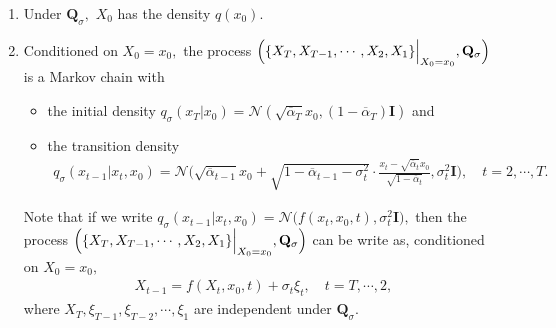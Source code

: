 \documentclass[
]{article}
\providecommand{\tightlist}{%
  \setlength{\itemsep}{0pt}\setlength{\parskip}{0pt}}\usepackage{longtable,booktabs,array}
\theoremstyle{remark}
\begin{document}
\begin{enumerate}
\def\labelenumi{\arabic{enumi}.}
\tightlist
\item
  Under \(\mathbf{Q}_{\sigma},\) \(X_0\) has the density \(q(x_0).\)
\item
  Conditioned on \(X_0=x_0,\) the process
  \(\Bigl( \lbrace X_T,X_{T-1},\cdots, X_2,X_1\rbrace\Big\vert_{X_0=x_0}, \mathbf{Q}_{\sigma} \Bigr)\)
  is a Markov chain with

  \begin{itemize}
  \tightlist
  \item
    the initial density
    \(q_{\sigma}(x_T\vert x_0)= \mathcal{N}(\sqrt{\overline{\alpha}_T}x_0,(1-\overline{\alpha}_T)\mathbf{I})\)
    and
  \item
    the transition density \[
     \begin{aligned}
       q_{\sigma} (x_{t-1}\vert x_t,x_0) = \mathcal{N}\biggl( \sqrt{\overline{\alpha}_{t-1}}x_0 + \sqrt{1-\overline{\alpha}_{t-1} - \sigma_t^2} \cdot \frac{x_t-\sqrt{\overline{\alpha}_t}x_0}{\sqrt{1-\overline{\alpha}_t}} , \sigma_t^2 \mathbf{I} \biggr), \quad t=2,\cdots, T.
     \end{aligned}
     \]
  \end{itemize}

  Note that if we write
  \(q_{\sigma}(x_{t-1}\vert x_t,x_0)=\mathcal{N} \bigl(f(x_t,x_0,t), \sigma_t^2 \mathbf{I}\bigr),\)
  then the process
  \(\Bigl( \lbrace X_T,X_{T-1},\cdots, X_2,X_1\rbrace\Big\vert_{X_0=x_0}, \mathbf{Q}_{\sigma} \Bigr)\)
  can be write as, conditioned on \(X_0=x_0,\) \[
  \begin{aligned}
    X_{t-1} = f(X_t,x_0,t) + \sigma_t \xi_t, \quad t=T,\cdots, 2,
  \end{aligned}
  \] where \(X_T,\xi_{T-1},\xi_{T-2},\cdots, \xi_{1}\) are independent
  under \(\mathbf{Q}_{\sigma}.\)
\end{enumerate}
\end{document}
